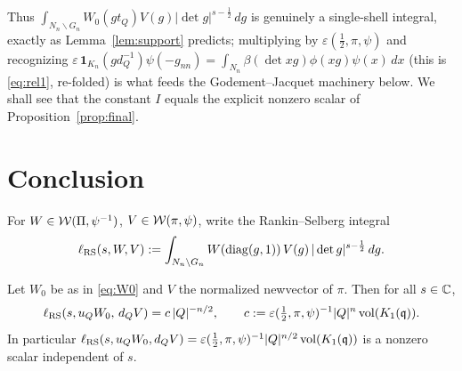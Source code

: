 Thus $\int_{N_n\backslash G_n}W_0(g t_Q)V(g)|\det g|^{s-\frac12}\,dg$ is genuinely a single-shell
integral, exactly as Lemma~\ref{lem:support} predicts; multiplying by $\varepsilon(\tfrac12,\pi,\psi)$
and recognizing $\varepsilon\,\mathbf 1_{K_n}(g d_Q^{-1})\psi(-g_{nn})=\int_{N_n}\beta(\det xg)\phi(xg)\psi(x)\,dx$
(this is \eqref{eq:rel1}, re-folded) is what feeds the Godement--Jacquet machinery below. We shall
see that the constant $I$ equals the explicit nonzero scalar of Proposition~\ref{prop:final}.

\section*{Conclusion}

For $W\in\mathcal{W}(\Pi,\psi^{-1})$, $V\in\mathcal{W}(\pi,\psi)$, write the Rankin--Selberg
integral
\[
\ell_{\mathrm{RS}}(s,W,V):=\int_{N_n\backslash G_n}W(\operatorname{diag}(g,1))\,V(g)\,|\det g|^{s-\frac12}\,dg.
\]

\begin{qtwoproposition}\label{prop:final}
Let $W_0$ be as in \eqref{eq:W0} and $V$ the normalized newvector of $\pi$. Then
for all $s\in\mathbb{C}$,
\[
\ell_{\mathrm{RS}}(s,u_Q W_0,\,d_Q V)=c\,|Q|^{-n/2},\qquad
c:=\varepsilon(\tfrac12,\pi,\psi)^{-1}|Q|^n\operatorname{vol}(K_1(\mathfrak{q})) .
\]
In particular $\ell_{\mathrm{RS}}(s,u_Q W_0,d_Q V)=\varepsilon(\tfrac12,\pi,\psi)^{-1}|Q|^{n/2}\operatorname{vol}(K_1(\mathfrak{q}))$
is a nonzero scalar independent of $s$.
\end{qtwoproposition}

